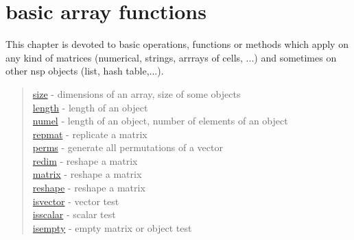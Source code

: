 \chapter*{basic array functions}

This chapter is devoted to basic operations, functions or methods which apply on
any kind of matrices (numerical, strings, arrrays of cells, ...) and sometimes
on other nsp objects (list, hash table,...).

\begin{quote}
\noindent
\hyperlink{size}{size} - dimensions of an array, size of some objects \\
\hyperlink{length}{length} - length of an object  \\
\hyperlink{numel}{numel} - length of an object, number of elements of an object  \\
\hyperlink{repmat}{repmat} - replicate a matrix\\
\hyperlink{perms}{perms} - generate all permutations of a vector\\
\hyperlink{redim}{redim} - reshape a matrix\\
\hyperlink{matrix}{matrix} - reshape a matrix\\
\hyperlink{reshape}{reshape} - reshape a matrix\\
\hyperlink{isvector}{isvector} - vector test\\
\hyperlink{isscalar}{isscalar} - scalar test\\
\hyperlink{isempty}{isempty} - empty matrix or object test\\
\end{quote}

%






